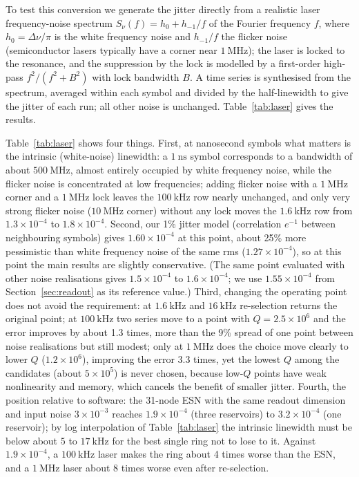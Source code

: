 To test this conversion we generate the jitter directly from a realistic laser frequency-noise spectrum $S_\nu(f)=h_0+h_{-1}/f$ of the Fourier frequency $f$, where
$h_0=\Delta\nu/\pi$ is the white frequency noise and $h_{-1}/f$ the flicker noise (semiconductor lasers typically have a corner near
$1~\mathrm{MHz}$); the laser is locked to the resonance, and the suppression by the lock is modelled by a first-order high-pass
$f^{2}/(f^{2}+B^{2})$ with lock bandwidth $B$. A time series is synthesised from the spectrum, averaged within each symbol and divided by the half-linewidth to
give the jitter of each run; all other noise is unchanged. Table~\ref{tab:laser} gives the results.



Table~\ref{tab:laser} shows four things. First, at nanosecond symbols what matters is the intrinsic (white-noise) linewidth: a
$1~\mathrm{ns}$ symbol corresponds to a bandwidth of about $500~\mathrm{MHz}$, almost entirely occupied by white frequency noise,
while the flicker noise is concentrated at low frequencies; adding flicker noise with a $1~\mathrm{MHz}$ corner and a
$1~\mathrm{MHz}$ lock leaves the $100~\mathrm{kHz}$ row nearly unchanged, and only very strong flicker noise ($10~\mathrm{MHz}$
corner) without any lock moves the $1.6~\mathrm{kHz}$ row from $1.3\times10^{-4}$ to $1.8\times10^{-4}$.
Second, our 1\% jitter model (correlation $e^{-1}$ between neighbouring symbols) gives $1.60\times10^{-4}$ at this point, about 25\%
more pessimistic than white frequency noise of the same rms ($1.27\times10^{-4}$), so at this point the main results are slightly
conservative. (The same point evaluated with other noise realisations gives $1.5\times10^{-4}$ to $1.6\times10^{-4}$; we use $1.55\times10^{-4}$
from Section~\ref{sec:readout} as its reference value.)
Third, changing the operating point does not avoid the requirement: at $1.6~\mathrm{kHz}$ and $16~\mathrm{kHz}$ re-selection returns
the original point; at $100~\mathrm{kHz}$ two series move to a point with $Q=2.5\times10^{6}$ and the error improves by about 1.3
times, more than the 9\% spread of one point between noise realisations but still modest; only at $1~\mathrm{MHz}$ does the choice
move clearly to lower $Q$ ($1.2\times10^{6}$), improving the error 3.3 times, yet the lowest $Q$ among the candidates (about
$5\times10^{5}$) is never chosen, because low-$Q$ points have weak nonlinearity and memory, which cancels the benefit of smaller
jitter.
Fourth, the position relative to software: the 31-node ESN with the same readout dimension and input noise $3\times10^{-3}$ reaches
$1.9\times10^{-4}$ (three reservoirs) to $3.2\times10^{-4}$ (one reservoir); by log interpolation of Table~\ref{tab:laser} the
intrinsic linewidth must be below about $5$ to $17~\mathrm{kHz}$ for the best single ring not to lose to it. Against
$1.9\times10^{-4}$, a $100~\mathrm{kHz}$ laser makes the ring about 4 times worse than the ESN, and a $1~\mathrm{MHz}$ laser about 8
times worse even after re-selection.

